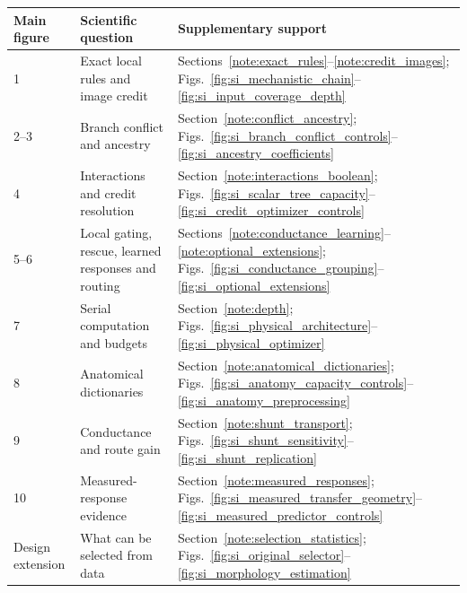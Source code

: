 \documentclass[11pt]{article}
\begin{document}
\begin{center}
\small
\begin{tabular}{p{}p{}p{}}
\toprule
Main figure & Scientific question & Supplementary support \\
\midrule
1 & Exact local rules and image credit & Sections~\ref{note:exact_rules}--\ref{note:credit_images}; Figs.~\ref{fig:si_mechanistic_chain}--\ref{fig:si_input_coverage_depth} \\
2--3 & Branch conflict and ancestry & Section~\ref{note:conflict_ancestry}; Figs.~\ref{fig:si_branch_conflict_controls}--\ref{fig:si_ancestry_coefficients} \\
4 & Interactions and credit resolution & Section~\ref{note:interactions_boolean}; Figs.~\ref{fig:si_scalar_tree_capacity}--\ref{fig:si_credit_optimizer_controls} \\
5--6 & Local gating, rescue, learned responses and routing & Sections~\ref{note:conductance_learning}--\ref{note:optional_extensions}; Figs.~\ref{fig:si_conductance_grouping}--\ref{fig:si_optional_extensions} \\
7 & Serial computation and budgets & Section~\ref{note:depth}; Figs.~\ref{fig:si_physical_architecture}--\ref{fig:si_physical_optimizer} \\
8 & Anatomical dictionaries & Section~\ref{note:anatomical_dictionaries}; Figs.~\ref{fig:si_anatomy_capacity_controls}--\ref{fig:si_anatomy_preprocessing} \\
9 & Conductance and route gain & Section~\ref{note:shunt_transport}; Figs.~\ref{fig:si_shunt_sensitivity}--\ref{fig:si_shunt_replication} \\
10 & Measured-response evidence & Section~\ref{note:measured_responses}; Figs.~\ref{fig:si_measured_transfer_geometry}--\ref{fig:si_measured_predictor_controls} \\
Design extension & What can be selected from data & Section~\ref{note:selection_statistics}; Figs.~\ref{fig:si_original_selector}--\ref{fig:si_morphology_estimation} \\
\bottomrule
\end{tabular}
\end{center}
\clearpage


\clearpage
\linenumbers



\clearpage



\clearpage
\end{document}
